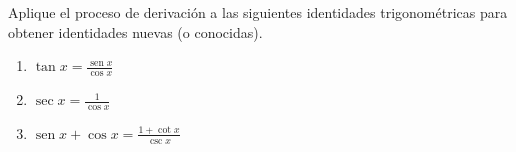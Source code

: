 \setcounter{enumi}{50}
\item Aplique el proceso de derivación a las siguientes identidades trigonométricas para obtener identidades nuevas (o conocidas).
\begin{enumerate}
    \item[(a)] $\displaystyle \tan x = \frac{\operatorname{sen} x}{\cos x}$
    \item[(b)] $\displaystyle \sec x = \frac{1}{\cos x}$
    \item[(c)] $\displaystyle \operatorname{sen} x + \cos x = \frac{1 + \cot x}{\csc x}$
\end{enumerate}
